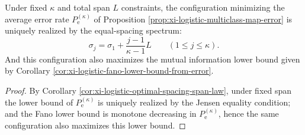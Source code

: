 \begin{corollary}\label{cor:xi-logistic-depth-design-law}
Under fixed \(\kappa\) and total span \(L\) constraints, the configuration minimizing the average error rate \(P_{\mathrm e}^{(\kappa)}\) of Proposition \ref{prop:xi-logistic-multiclass-map-error} is uniquely realized by the equal-spacing spectrum:
\[
\sigma_j=\sigma_1+\frac{j-1}{\kappa-1}L\qquad(1\le j\le\kappa).
\]
And this configuration also maximizes the mutual information lower bound given by Corollary \ref{cor:xi-logistic-fano-lower-bound-from-error}.
\end{corollary}
\begin{proof}
By Corollary \ref{cor:xi-logistic-optimal-spacing-span-law}, under fixed span the lower bound of \(P_{\mathrm e}^{(\kappa)}\) is uniquely realized by the Jensen equality condition;
and the Fano lower bound is monotone decreasing in \(P_{\mathrm e}^{(\kappa)}\), hence the same configuration also maximizes this lower bound.
\end{proof}
